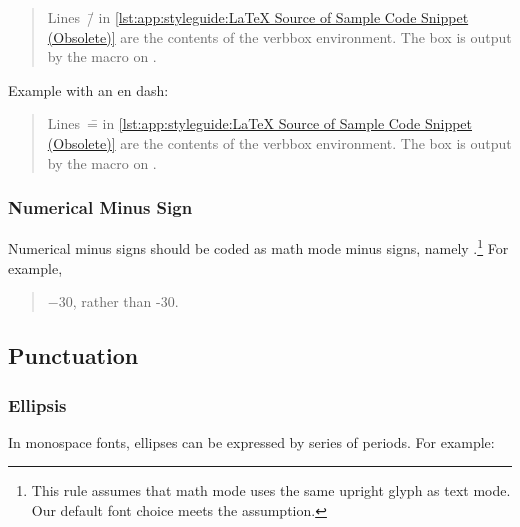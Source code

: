 \begin{quote}
\begin{fcvref}
  Lines~\=/ in
  \cref{lst:app:styleguide:LaTeX Source of Sample Code Snippet (Obsolete)}
  are the contents of the verbbox environment.
  The box is output by the \co{\\theverbbox} macro on .
\end{fcvref}
\end{quote}

Example with an en dash:

\begin{quote}
\begin{fcvref}
  Lines~\== in
  \cref{lst:app:styleguide:LaTeX Source of Sample Code Snippet (Obsolete)}
  are the contents of the verbbox environment.
  The box is output by the \co{\\theverbbox} macro on .
\end{fcvref}
\end{quote}

\subsubsection{Numerical Minus Sign}
\label{sec:app:styleguide:Numerical Minus Sign}

Numerical minus signs should be coded as math mode minus signs,
namely \qco{$-$}.\footnote{This rule assumes that math mode uses the
  same upright glyph as text mode.
  Our default font choice meets the assumption.
}
For example,

\begin{quote}
  $-30$, rather than -30.
\end{quote}

\subsection{Punctuation}
\label{sec:app:styleguide:Punctuation}

\subsubsection{Ellipsis}
\label{sec:app:styleguide:Ellipsis}

In monospace fonts, ellipses can be expressed by series of periods.
For example:

